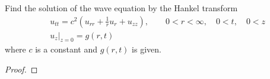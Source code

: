 \begin{problem}{2}
  Find the solution of the wave equation by the Hankel transform
  \begin{align*}
    &u_{tt} = c^2\left(u_{rr} + \frac{1}{r}u_r + u_{zz}\right), \qquad 0 < r < \infty, \quad 0 < t, \quad 0 < z\\
    &u_z\rvert_{z=0} = g(r,t)
  \end{align*}
  where $c$ is a constant and $g(r,t)$ is given.
\end{problem}

\begin{proof}
\end{proof}
\newpage
